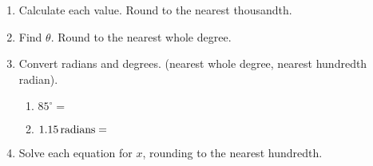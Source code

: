 \documentclass[12pt, twoside]{article}
\begin{document}
\begin{enumerate}
\newpage
\item Calculate each value. Round to the nearest thousandth.
  \begin{enumerate}
\end{enumerate}
  \vspace{1cm}

  \item Find $\theta$. Round to the nearest whole degree.
  \begin{enumerate}
\end{enumerate} \vspace{2cm}

\item Convert radians and degrees. (nearest whole degree, nearest hundredth radian).\vspace{.25cm}
\begin{multicols}{2}
  \begin{enumerate}
    \item $85^\circ = $ \vspace{1cm}
    \item $\displaystyle 1.15 \,\rm{radians}=$ \vspace{1cm}
  \end{enumerate}
\end{multicols} \vspace{2cm}


  \item Solve each equation for $x$, rounding to the nearest hundredth.
  \begin{enumerate}
\end{enumerate}
  \vspace{3cm}


\end{enumerate}
\end{document}

